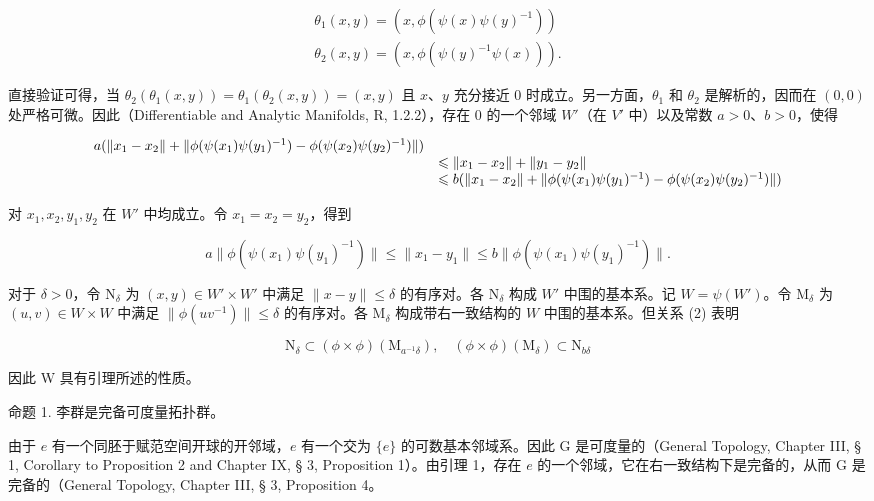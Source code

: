 \[
\begin{array}{l} \theta_ {1} (x, y) = (x, \phi (\psi (x) \psi (y) ^ {- 1})) \\ \theta_ {2} (x, y) = (x, \phi (\psi (y) ^ {- 1} \psi (x))). \end{array}
\]

直接验证可得，当 \(\theta_{2}(\theta_{1}(x,y)) = \theta_{1}(\theta_{2}(x,y)) = (x,y)\) 且 \(x\)、\(y\) 充分接近 0 时成立。另一方面，\(\theta_{1}\) 和 \(\theta_{2}\) 是解析的，因而在 \((0,0)\) 处严格可微。因此（Differentiable and Analytic Manifolds, R, 1.2.2），存在 0 的一个邻域 \(W'\)（在 \(V'\) 中）以及常数 \(a > 0\)、\(b > 0\)，使得

\[
\begin{array}{r l} a (\| x _ {1} - x _ {2} \| + \| \phi (\psi (x _ {1}) \psi (y _ {1}) ^ {- 1}) - \phi (\psi (x _ {2}) \psi (y _ {2}) ^ {- 1}) \|) \\ & \leqslant \| x _ {1} - x _ {2} \| + \| y _ {1} - y _ {2} \| \\ & \leqslant b (\| x _ {1} - x _ {2} \| + \| \phi (\psi (x _ {1}) \psi (y _ {1}) ^ {- 1}) - \phi (\psi (x _ {2}) \psi (y _ {2}) ^ {- 1}) \|) \end{array}
\]

对 \(x_1, x_2, y_1, y_2\) 在 \(W'\) 中均成立。令 \(x_1 = x_2 = y_2\)，得到

\[
a \| \phi (\psi (x _ {1}) \psi (y _ {1}) ^ {- 1}) \| \leqslant \| x _ {1} - y _ {1} \| \leqslant b \| \phi (\psi (x _ {1}) \psi (y _ {1}) ^ {- 1}) \|.\tag{2}
\]

对于 \(\delta > 0\)，令 \(\mathrm{N}_{\delta}\) 为 \((x,y)\in W'\times W'\) 中满足 \(\| x - y\| \leqslant \delta\) 的有序对。各 \(\mathrm{N}_{\delta}\) 构成 \(W'\) 中围的基本系。记 \(W = \psi(W')\)。令 \(\mathrm{M}_{\delta}\) 为 \((u,v)\in W\times W\) 中满足 \(\| \phi (u v^{-1})\| \leqslant \delta\) 的有序对。各 \(\mathrm{M}_{\delta}\) 构成带右一致结构的 \(W\) 中围的基本系。但关系 (2) 表明

\[
\mathrm{N} _ {\delta} \subset (\phi \times \phi) (\mathrm{M} _ {a ^ {- 1} \delta}), \quad (\phi \times \phi) (\mathrm{M} _ {\delta}) \subset \mathrm{N} _ {b \delta}
\]

因此 W 具有引理所述的性质。

命题 1. 李群是完备可度量拓扑群。

由于 \(e\) 有一个同胚于赋范空间开球的开邻域，\(e\) 有一个交为 \(\{e\}\) 的可数基本邻域系。因此 G 是可度量的（General Topology, Chapter III, § 1, Corollary to Proposition 2 and Chapter IX, § 3, Proposition 1）。由引理 1，存在 \(e\) 的一个邻域，它在右一致结构下是完备的，从而 G 是完备的（General Topology, Chapter III, § 3, Proposition 4。

